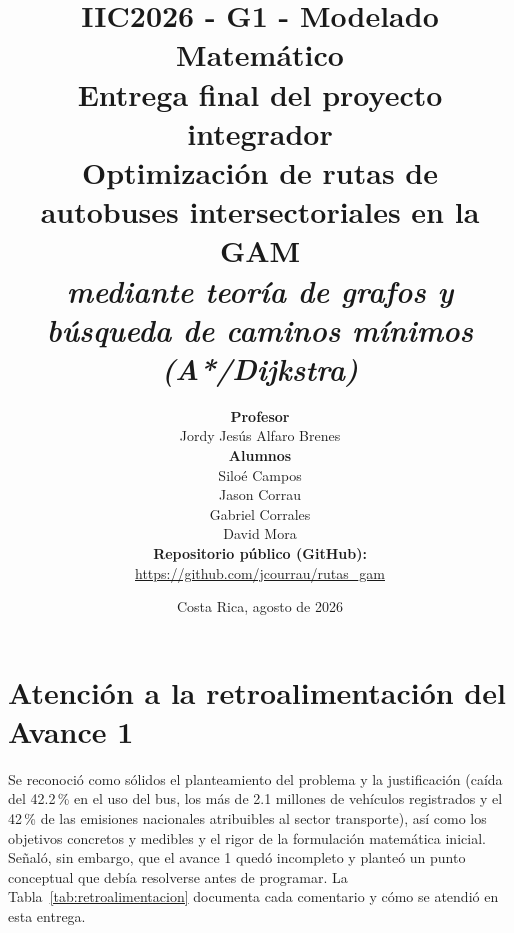 \documentclass[11pt]{article}
\title{
    \textbf{IIC2026 - G1 - Modelado Matemático}\\[4pt]
    \large Entrega final del proyecto integrador\\[8pt]
    \Large\textbf{Optimización de rutas de autobuses intersectoriales en la GAM}\\[4pt]
    \normalsize\textit{mediante teoría de grafos y búsqueda de caminos mínimos (A*/Dijkstra)}
}
\author{
    \textbf{Profesor}\\ Jordy Jesús Alfaro Brenes \\[8pt]
    \textbf{Alumnos}\\
    Siloé Campos \\ Jason Corrau \\ Gabriel Corrales \\ David Mora \\[8pt]
    \textbf{Repositorio público (GitHub):}\\ \url{https://github.com/jcourrau/rutas_gam}
}
\date{Costa Rica, agosto de 2026}
\numberwithin{equation}{section}
\begin{document}
\maketitle
\thispagestyle{empty}
\newpage

\tableofcontents
\newpage

\section{Atención a la retroalimentación del Avance 1}\label{sec:retroalimentacion}

Se reconoció como sólidos el planteamiento del problema y la justificación (caída del 42.2\,\% en el uso del bus, los más de 2.1 millones de vehículos registrados y el 42\,\% de las emisiones nacionales atribuibles al sector transporte), así como los objetivos concretos y medibles y el rigor de la formulación matemática inicial. Señaló, sin embargo, que el avance 1 quedó incompleto y planteó un punto conceptual que debía resolverse antes de programar. La Tabla~\ref{tab:retroalimentacion} documenta cada comentario y cómo se atendió en esta entrega.
\end{document}
